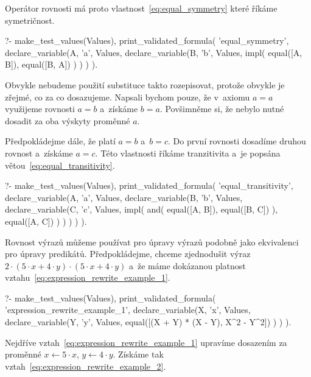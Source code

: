 Operátor rovnosti má proto vlastnost~\eqref{eq:equal_symmetry} které říkáme symetričnost.

\begin{fact}
\begin{prolog}
?- 	make_test_values(Values),
	print_validated_formula(
		'equal_symmetry',
		declare_variable(A, 'a', Values,
			declare_variable(B, 'b', Values,
				impl(
					equal([A, B]),
					equal([B, A])
				)
			)
		)
	).
\end{prolog}
\end{fact}

Obvykle nebudeme použití substituce takto rozepisovat, protože obvykle je zřejmé, co za co dosazujeme. Napsali bychom pouze, že v~axiomu \(a = a\) využijeme rovnosti \(a = b\) a~získáme \(b = a\). Povšimněme si, že nebylo nutné dosadit za oba výskyty proměnné \(a\).

Předpokládejme dále, že platí \(a = b\) a~\(b = c\). Do první rovnosti dosadíme druhou rovnost a~získáme \(a = c\). Této vlastnosti říkáme tranzitivita a~je popsána větou~\eqref{eq:equal_transitivity}.

\begin{fact}
\begin{prolog}
?- 	make_test_values(Values),
	print_validated_formula(
		'equal_transitivity',
		declare_variable(A, 'a', Values,
			declare_variable(B, 'b', Values,
				declare_variable(C, 'c', Values,
					impl(
						and(
							equal([A, B]),
							equal([B, C])
						),
						equal([A, C])
					)
				)
			)
		)
	).
\end{prolog}
\end{fact}

Rovnost výrazů můžeme používat pro úpravy výrazů podobně jako ekvivalenci pro úpravy predikátů. Předpokládejme, chceme zjednodušit výraz \(2 \cdot (5 \cdot x + 4 \cdot y) \cdot (5 \cdot x + 4 \cdot y)\) a~že máme dokázanou platnost vztahu~\eqref{eq:expression_rewrite_example_1}.

\begin{prolog}
?- 	make_test_values(Values),
	print_validated_formula(
		'expression_rewrite_example_1',
		declare_variable(X, 'x', Values,
			declare_variable(Y, 'y', Values,
				equal([(X + Y) * (X - Y), X^2 - Y^2])
			)
		)
	).
\end{prolog}

Nejdříve vztah~\ref{eq:expression_rewrite_example_1} upravíme dosazením za proměnné \(x \leftarrow 5 \cdot x\), \(y \leftarrow 4 \cdot y\). Získáme tak vztah~\eqref{eq:expression_rewrite_example_2}.

